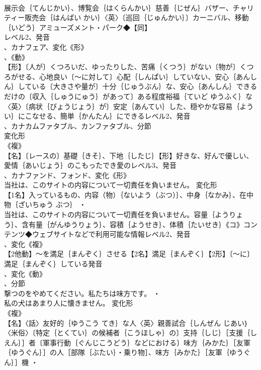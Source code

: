 \documentclass[8pt]{extreport}
\begin{document}
\begin{CJK}{UTF8}{min}
\\	展示会｛てんじかい｝、博覧会｛はくらんかい｝慈善｛じぜん｝バザー、チャリティー販売会｛はんばい かい｝〈英〉〔巡回｛じゅんかい｝〕カーニバル、移動｛いどう｝アミューズメント・パーク◆【同】
\\	レベル2、発音
\\	、カナフェア、変化《形》
\\	、《動》
\\	【形】〔人が〕くつろいだ、ゆったりした、苦痛｛くつう｝がない〔物が〕くつろがせる、心地良い〔～に対して〕心配｛しんぱい｝していない、安心｛あんしん｝している〔大きさや量が〕十分｛じゅうぶん｝な、安心｛あんしん｝できるだけの〔収入｛しゅうにゅう｝があって〕ある程度裕福｛ていど ゆうふく｝な〈英〉〔病状｛びょうじょう｝が〕安定｛あんてい｝した、穏やかな容易｛ようい｝にこなせる、簡単｛かんたん｝にできるレベル2、発音
\\	、カナカムファタブル、カンファタブル、分節
\\	変化形 
\\	《複》
\\	【名】〔レースの〕基礎｛きそ｝、下地｛したじ｝【形】好きな、好んで優しい、愛情｛あいじょう｝のこもったでき愛のレベル3、発音
\\	、カナファンド、フォンド、変化《形》
\\	当社は、このサイトの内容について一切責任を負いません。	変化形 
\\	【1名】入っているもの、内容（物）｛ないよう（ぶつ）｝、中身｛なかみ｝、在中物｛ざいちゅう ぶつ｝ ・
\\	当社は、このサイトの内容について一切責任を負いません。容量｛ようりょう｝、含有量｛がんゆうりょう｝、容積｛ようせき｝、体積｛たいせき｝《コ》コンテンツ◆ウェブサイトなどで利用可能な情報レベル2、発音
\\	、変化《複》
\\	【2他動】～を満足｛まんぞく｝させる【2名】満足｛まんぞく｝【2形】〔～に〕満足｛まんぞく｝している発音
\\	、変化《動》
\\	、分節
\\	撃つのをやめてください。私たちは味方です。 ・
\\	私の犬はあまり人に懐きません。	変化形 
\\	《複》
\\	【名】〈話〉友好的｛ゆうこう てき｝な人〈英〉親善試合｛しんぜん じあい｝〈米俗〉〔特定｛とくてい｝の候補者｛こうほしゃ｝の〕支持｛しじ｝［支援｛しえん｝］者〔軍事行動｛ぐんじこうどう｝などにおける〕味方｛みかた｝［友軍｛ゆうぐん｝］の人［部隊｛ぶたい｝・乗り物］、味方｛みかた｝［友軍｛ゆうぐん｝］機 ・

\end{CJK}
\end{document}
